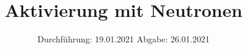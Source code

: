 

\subject{702}
\title{Aktivierung mit Neutronen}
\date{%
  Durchführung: 19.01.2021
  \hspace{3em}
  Abgabe: 26.01.2021
}



\maketitle
\thispagestyle{empty}
\tableofcontents
\newpage








\printbibliography{}



